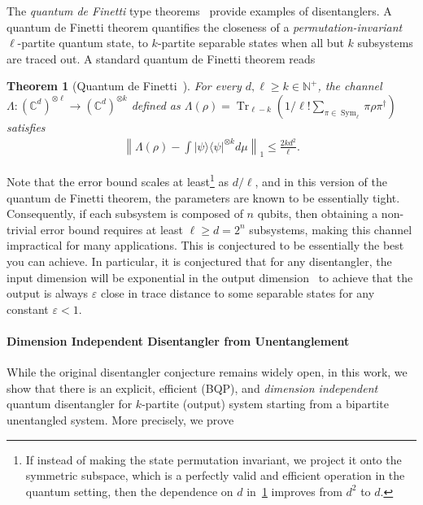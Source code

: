 \documentclass[10pt,a4paper]{article}
\newtheorem{theorem}{Theorem}[section]
\theoremstyle{remark}
\def\to{\rightarrow}
\def\epsilon{\varepsilon}
\newcommand{\norm}[1]{\ensuremath{\left\lVert #1 \right\rVert}}
\newcommand{\1}[1]{\mathds{1}{[#1]}}
\newcommand{\ket}[1]{\lvert #1\rangle}
\DeclareMathOperator{\Sym}{Sym}
\DeclareMathOperator{\Tr}{Tr}
\newcommand{\bra}[1]{\langle#1|}
\numberwithin{equation}{section}
\begin{document}
The \emph{quantum de Finetti} type theorems~\cite{christandl2007one,KR05,Renner08} provide examples of
disentanglers.
%
A quantum de Finetti theorem quantifies the closeness of a \emph{permutation-invariant} $\ell$-partite
quantum state, to $k$-partite separable states when all but $k$ subsystems are traced out.
%
A standard quantum de Finetti theorem reads
\begin{theorem}[Quantum de Finetti~\cite{KR05}]\label{thm:std_quantum_de_finetti}
  For every $d,\ell\ge k \in \mathbb{N}^+$, the channel $\Lambda \colon (\mathbb{C}^{d})^{\otimes \ell} \to (\mathbb{C}^d)^{\otimes k}$
  defined as $\Lambda(\rho) = \Tr_{\ell-k}(1/\ell! \sum_{\pi \in \Sym_\ell} \pi \rho \pi^{\dag})$ satisfies
  \begin{align*}
    \norm{\Lambda(\rho) - \int \ket{\psi}\bra{\psi}^{\otimes k} d\mu}_1 \le \frac{2 k d^2}{\ell}.
  \end{align*}
\end{theorem}
Note that the error bound scales at least\footnote{If instead of making the state permutation invariant,
we project it onto the symmetric subspace, which is a perfectly valid and efficient operation in the
quantum setting, then the dependence on $d$ in~\cref{thm:std_quantum_de_finetti} improves from $d^2$ to $d$.}
as $d/\ell$, and in this version of the quantum de Finetti theorem, the parameters are known to be essentially
tight.
%
Consequently, if each subsystem is composed of $n$ qubits, then obtaining
a non-trivial error bound requires at least $\ell \ge d = 2^{n}$
subsystems, making this channel impractical for many applications.
%
This is conjectured to be essentially the best you can achieve. In particular,
it is conjectured that for any disentangler, the input dimension will be
exponential in the output dimension~\cite{ABDFS08} to achieve that the output is always $\epsilon$ close in trace distance to some separable states for any constant $\epsilon<1$. 

\paragraph{Dimension Independent Disentangler from Unentanglement}
While the original disentangler conjecture remains widely open, in this work,
we show that there is an explicit, efficient (BQP), and \emph{dimension independent}
quantum disentangler for $k$-partite (output) system starting from a bipartite
unentangled system. More precisely, we prove
\end{document}
